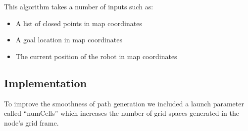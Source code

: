  This algorithm takes a number
of inputs such as:
\begin{itemize}
\item
  A list of closed points in map coordinates
\item
  A goal location in map coordinates
\item
  The current position of the robot in map coordinates
\end{itemize}


\subsection{Implementation}
To improve the smoothness of path generation we included a launch parameter called ``numCells'' which increases the number of grid spaces generated in the node's grid frame. 


